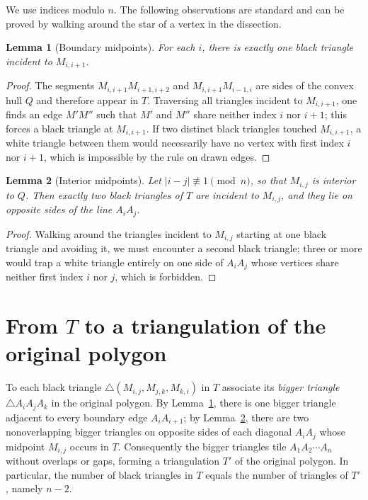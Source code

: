 \documentclass[11pt]{article}
\newtheorem{lemma}{Lemma}
\begin{document}
We use indices modulo $n$. The following observations are standard and can be proved by walking around the star of a vertex in the dissection.

\begin{lemma}[Boundary midpoints]\label{lem:boundary}
For each $i$, there is exactly one black triangle incident to $M_{i,i+1}$.
\end{lemma}

\begin{proof}
The segments $M_{i,i+1}M_{i+1,i+2}$ and $M_{i,i+1}M_{i-1,i}$ are sides of the convex hull $Q$ and therefore appear in $T$. Traversing all triangles incident to $M_{i,i+1}$, one finds an edge $M'M''$ such that $M'$ and $M''$ share neither index $i$ nor $i{+}1$; this forces a black triangle at $M_{i,i+1}$. If two distinct black triangles touched $M_{i,i+1}$, a white triangle between them would necessarily have no vertex with first index $i$ nor $i{+}1$, which is impossible by the rule on drawn edges.
\end{proof}

\begin{lemma}[Interior midpoints]\label{lem:interior}
Let $|i-j|\not\equiv 1 \pmod n$, so that $M_{i,j}$ is interior to $Q$. Then exactly two black triangles of $T$ are incident to $M_{i,j}$, and they lie on opposite sides of the line $A_iA_j$.
\end{lemma}

\begin{proof}
Walking around the triangles incident to $M_{i,j}$ starting at one black triangle and avoiding it, we must encounter a second black triangle; three or more would trap a white triangle entirely on one side of $A_iA_j$ whose vertices share neither first index $i$ nor $j$, which is forbidden.
\end{proof}

\section{From $T$ to a triangulation of the original polygon}

To each black triangle $\triangle(M_{i,j},M_{j,k},M_{k,i})$ in $T$ associate its \emph{bigger triangle} $\triangle A_iA_jA_k$ in the original polygon. By Lemma~\ref{lem:boundary}, there is one bigger triangle adjacent to every boundary edge $A_iA_{i+1}$; by Lemma~\ref{lem:interior}, there are two nonoverlapping bigger triangles on opposite sides of each diagonal $A_iA_j$ whose midpoint $M_{i,j}$ occurs in $T$. Consequently the bigger triangles tile $A_1A_2\cdots A_n$ without overlaps or gaps, forming a triangulation $T'$ of the original polygon. In particular, the number of black triangles in $T$ equals the number of triangles of $T'$, namely $n-2$.
\end{document}
